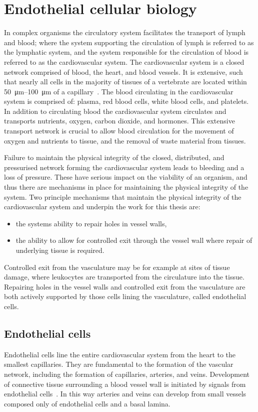 \section{Endothelial cellular biology}
\label{introduction:endothelial_cellular_biology} 
In complex organisms the circulatory system facilitates the transport of lymph and blood; where the system supporting the circulation of lymph is referred to as the lymphatic system, and the system responsible for the circulation of blood is referred to as the cardiovascular system. The cardiovascular system is a closed network comprised of blood, the heart, and blood vessels. It is extensive, such that nearly all cells in the majority of tissues of a vertebrate are located within \SIrange{50}{100}{\micro\meter} of a capillary~\cite{Alberts2002}. The blood circulating in the cardiovascular system is comprised of: plasma, red blood cells, white blood cells, and platelets. In addition to circulating blood the cardiovascular system circulates and transports nutrients, oxygen, carbon dioxide, and hormones. This extensive transport network is crucial to allow blood circulation for the movement of oxygen and nutrients to tissue, and the removal of waste material from tissues.

Failure to maintain the physical integrity of the closed, distributed, and pressurised network forming the cardiovascular system leads to bleeding and a loss of pressure. These have serious impact on the viability of an organism, and thus there are mechanisms in place for maintaining the physical integrity of the system. Two principle mechanisms that maintain the physical integrity of the cardiovascular system and underpin the work for this thesis are:
\begin{itemize}
    \item{the systems ability to repair holes in vessel walls,}
    \item{the ability to allow for controlled exit through the vessel wall where repair of underlying tissue is required.}
\end{itemize}
Controlled exit from the vasculature may be for example at sites of tissue damage, where leukocytes are transported from the circulature into the tissue. Repairing holes in the vessel walls and controlled exit from the vasculature are both actively supported by those cells lining the vasculature, called endothelial cells.

\subsection{Endothelial cells}
\label{introduction:endothelial_cellular_biology:endothelial_cells}
Endothelial cells line the entire cardiovascular system from the heart to the smallest capillaries. They are fundamental to the formation of the vascular network, including the formation of capillaries, arteries, and veins. Development of connective tissue surrounding a blood vessel wall is initiated by signals from endothelial cells~\cite{Alberts2002}. In this way arteries and veins can develop from small vessels composed only of endothelial cells and a basal lamina.

